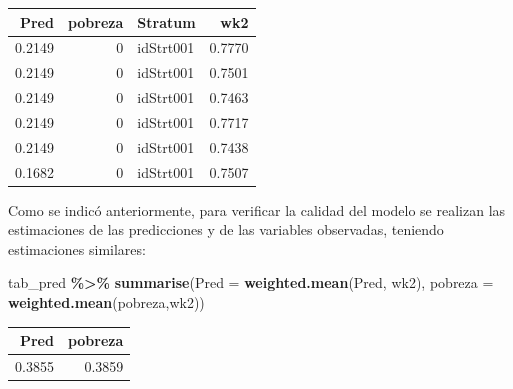 \documentclass[
  spanish,
  12pt,
]{book}
\newenvironment{Shaded}{\begin{snugshade}}{\end{snugshade}}
\newcommand{\AttributeTok}[1]{\textcolor[rgb]{0.13,0.29,0.53}{#1}}
\newcommand{\DataTypeTok}[1]{\textcolor[rgb]{0.13,0.29,0.53}{#1}}
\newcommand{\DecValTok}[1]{\textcolor[rgb]{0.00,0.00,0.81}{#1}}
\newcommand{\FunctionTok}[1]{\textcolor[rgb]{0.13,0.29,0.53}{\textbf{#1}}}
\newcommand{\NormalTok}[1]{#1}
\newcommand{\OtherTok}[1]{\textcolor[rgb]{0.56,0.35,0.01}{#1}}
\newcommand{\SpecialCharTok}[1]{\textcolor[rgb]{0.81,0.36,0.00}{\textbf{#1}}}
\newcommand{\StringTok}[1]{\textcolor[rgb]{0.31,0.60,0.02}{#1}}
\begin{document}
\begin{Shaded}
\end{Shaded}

\begin{tabular}{r|r|l|r}
\hline
Pred & pobreza & Stratum & wk2\\
\hline
0.2149 & 0 & idStrt001 & 0.7770\\
\hline
0.2149 & 0 & idStrt001 & 0.7501\\
\hline
0.2149 & 0 & idStrt001 & 0.7463\\
\hline
0.2149 & 0 & idStrt001 & 0.7717\\
\hline
0.2149 & 0 & idStrt001 & 0.7438\\
\hline
0.1682 & 0 & idStrt001 & 0.7507\\
\hline
\end{tabular}

Como se indicó anteriormente, para verificar la calidad del modelo se realizan las estimaciones de las predicciones y de las variables observadas, teniendo estimaciones similares:

\begin{Shaded}
\begin{Highlighting}[]
\NormalTok{tab\_pred }\SpecialCharTok{\%\textgreater{}\%} 
  \FunctionTok{summarise}\NormalTok{(}\AttributeTok{Pred =} \FunctionTok{weighted.mean}\NormalTok{(Pred, wk2), }
            \AttributeTok{pobreza =} \FunctionTok{weighted.mean}\NormalTok{(pobreza,wk2))}
\end{Highlighting}
\end{Shaded}

\begin{tabular}{r|r}
\hline
Pred & pobreza\\
\hline
0.3855 & 0.3859\\
\hline
\end{tabular}
\end{document}
